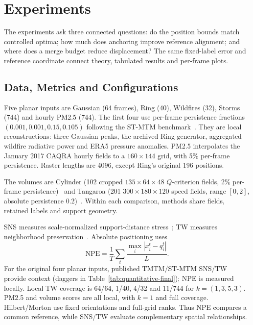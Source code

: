 \documentclass[review]{vgtc}
\begin{document}
\section{Experiments}\label{sec:experiments}
The experiments ask three connected questions: do the position bounds match controlled optima; how much does anchoring improve reference alignment; and where does a merge budget reduce displacement? The same fixed-label error and reference coordinate connect theory, tabulated results and per-frame plots.


\subsection{Data, Metrics and Configurations}
Five planar inputs are Gaussian (64 frames), Ring (40), Wildfires (32), Storms (744) and hourly PM2.5 (744). The first four use per-frame persistence fractions $(0.001,0.001,0.15,0.105)$ following the ST-MTM benchmark~\cite{STMTM:2026}. They are local reconstructions: three Gaussian peaks, the archived Ring generator, aggregated wildfire radiative power and ERA5 pressure anomalies. PM2.5 interpolates the January 2017 CAQRA hourly fields to a $160\times144$ grid, with 5\% per-frame persistence. Raster lengths are 4096, except Ring's original 196 positions.

The volumes are Cylinder (102 cropped $135\times64\times48$ $Q$-criterion fields, 2\% per-frame persistence)~\cite{Camarri:2005:Cylinder,Weinkauf:SquareCylinder} and Tangaroa (201 $300\times180\times120$ speed fields, range $[0,2]$, absolute persistence 0.2)~\cite{Popinet:2004:Tangaroa}. Within each comparison, methods share fields, retained labels and support geometry.

SNS measures scale-normalized support-distance stress~\cite{Smelser:2025:Scale}; TW measures neighborhood preservation~\cite{Venna:2001:NP}. Absolute positioning uses
\begin{equation}\label{eq:experimental-npe}
\mathrm{NPE}=\frac1T\sum_t\frac{\max_i|x_i^t-q_i^t|}{L}.
\end{equation}
For the original four planar inputs, published TMTM/ST-MTM SNS/TW provide context (daggers in Table~\ref{tab:quantitative-final}); NPE is measured locally. Local TW coverage is 64/64, 1/40, 4/32 and 11/744 for $k=(1,3,5,3)$. PM2.5 and volume scores are all local, with $k=1$ and full coverage. Hilbert/Morton use fixed orientations and full-grid ranks. Thus NPE compares a common reference, while SNS/TW evaluate complementary spatial relationships.
\end{document}
